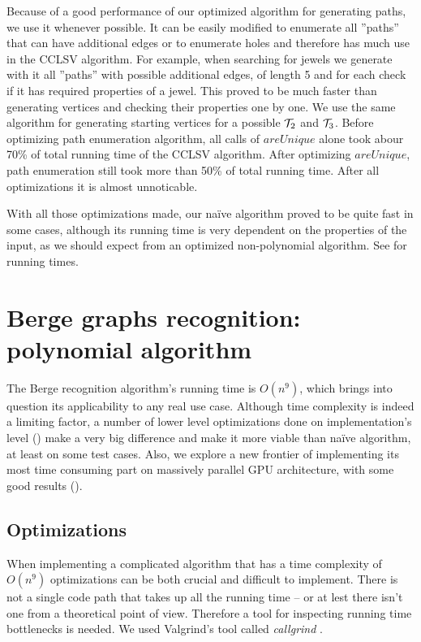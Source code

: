 Because of a good performance of our optimized algorithm for generating paths, we use it whenever possible. It can be easily modified to enumerate all ''paths'' that can have additional edges or to enumerate holes and therefore has much use in the CCLSV algorithm. For example, when searching for jewels we generate with it all ''paths'' with possible additional edges, of length 5 and for each check if it has required properties of a jewel. This proved to be much faster than generating vertices and checking their properties one by one. We use the same algorithm for generating starting vertices for a possible $\mathcal{T}_2$ and $\mathcal{T}_3$. Before optimizing path enumeration algorithm, all calls of $areUnique$ alone took abour 70\% of total running time of the CCLSV algorithm. After optimizing $areUnique$, path enumeration still took more than 50\% of total running time. After all optimizations it is almost unnoticable.

With all those optimizations made, our na\"ive algorithm proved to be quite fast in some cases, although its running time is very dependent on the properties of the input, as we should expect from an optimized non-polynomial algorithm. See  for running times.

\section{Berge graphs recognition: polynomial algorithm}


The Berge recognition algorithm's running time is $O(n^9)$, which brings into question its applicability to any real use case. Although time complexity is indeed a limiting factor, a number of lower level optimizations done on implementation's level () make a very big difference and make it more viable than na\"ive algorithm, at least on some test cases. Also, we explore a new frontier of implementing its most time consuming part on massively parallel GPU architecture, with some good results ().


\subsection{Optimizations}
\label{sec:Optimizations}

When implementing a complicated algorithm that has a time complexity of $O(n^9)$ optimizations can be both crucial and difficult to implement. There is not a single code path that takes up all the running time -- or at lest there isn't one from a theoretical point of view. Therefore a tool for inspecting running time bottlenecks is needed. We used Valgrind's tool called \emph{callgrind} \cite{callgrind}.


